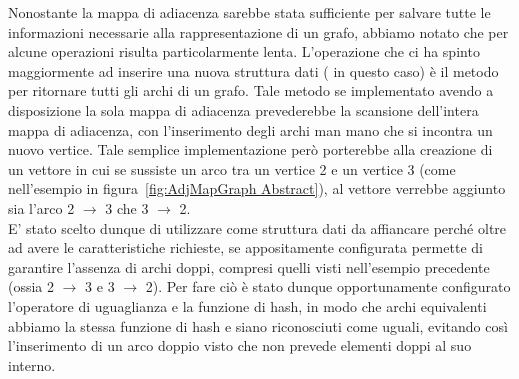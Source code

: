 Nonostante la mappa di adiacenza sarebbe stata sufficiente per salvare tutte le informazioni necessarie alla rappresentazione di un grafo, abbiamo notato che per alcune operazioni risulta particolarmente lenta. L'operazione che ci ha spinto maggiormente ad inserire una nuova struttura dati ( in questo caso) è il metodo per ritornare tutti gli archi di un grafo. Tale metodo se implementato avendo a disposizione la sola mappa di adiacenza prevederebbe la scansione dell'intera mappa di adiacenza, con l'inserimento degli archi man mano che si incontra un nuovo vertice. Tale semplice implementazione però porterebbe alla creazione di un vettore in cui se sussiste un arco tra un vertice 2 e un vertice 3 (come nell'esempio in figura~\ref{fig:AdjMapGraph Abstract}), al vettore verrebbe aggiunto sia l'arco 2 $\rightarrow$ 3 che 3 $\rightarrow$ 2. \\



E' stato scelto dunque di utilizzare come struttura dati da affiancare  perché oltre ad avere le caratteristiche richieste, se appositamente configurata permette di garantire l'assenza di archi doppi, compresi quelli visti nell'esempio precedente (ossia 2 $\rightarrow$ 3 e 3 $\rightarrow$ 2). Per fare ciò è stato dunque opportunamente configurato l'operatore di uguaglianza e la funzione di hash, in  modo che archi equivalenti abbiamo la stessa funzione di hash e siano riconosciuti come uguali, evitando così l'inserimento di un arco doppio visto che  non prevede elementi doppi al suo interno.\\

